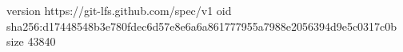version https://git-lfs.github.com/spec/v1
oid sha256:d17448548b3e780fdec6d57e8e6a6a861777955a7988e2056394d9e5c0317c0b
size 43840
